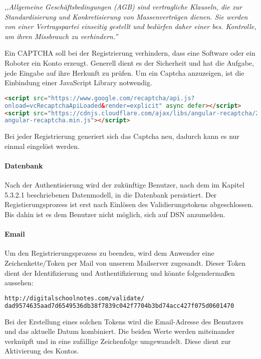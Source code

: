 \textit{,,Allgemeine Geschäftsbedingungen (AGB) sind vertragliche Klauseln, die zur Standardisierung und Konkretisierung von Massenverträgen dienen. Sie werden von einer Vertragspartei einseitig gestellt und bedürfen daher einer bes. Kontrolle, um ihren Missbrauch zu verhindern.''}\cite{AGB}\\
\cite{VERTEILTE_SYSTEME,PASSWORT_SCHUTZ}

\newpage


Ein \gls{CAPTCHA} soll bei der Registrierung verhindern, dass eine Software oder ein Roboter ein Konto erzeugt. Generell dient es der Sicherheit und hat die Aufgabe, jede Eingabe auf ihre Herkunft zu prüfen. Um ein Captcha anzuzeigen, ist die Einbindung einer JavaScript Library notwendig. \cite{CAPTCHA}
\begin{lstlisting}[caption={Einbindung der JS-Library Recaptcha}, language=HTML]
<script src="https://www.google.com/recaptcha/api.js?
onload=vcRecaptchaApiLoaded&render=explicit" async defer></script>
<script src="https://cdnjs.cloudflare.com/ajax/libs/angular-recaptcha/2.2.5/
angular-recaptcha.min.js"></script>
\end{lstlisting}

Bei jeder Registrierung generiert sich das Captcha neu, dadurch kann es nur einmal eingelöst werden.


\paragraph{Datenbank}
Nach der Authentisierung wird der zukünftige Benutzer, nach dem im Kapitel 5.3.2.1 beschriebenen Datenmodell, in die Datenbank persistiert. Der Registierungsprozess ist erst nach Einlösen des Validierungstokens abgeschlossen. Bis dahin ist es dem Benutzer nicht möglich, sich auf DSN anzumelden.

\paragraph{Email}
Um den Registrierungsprozess zu beenden, wird dem Anwender eine Zeichenkette/Token per Mail von unserem Mailserver zugesandt. Dieser Token dient der Identifizierung und Authentifizierung und könnte folgendermaßen aussehen:
\begin{lstlisting}[caption={Validierungstoken für die Aktivierung des DSN-Accounts}, language=bash]
http://digitalschoolnotes.com/validate/
dad9574635aad7d6549536db38f7839c042f7704b3bd74acc427f075d0601470
\end{lstlisting}
Bei der Erstellung eines solchen Tokens wird die Email-Adresse des Benutzers und das aktuelle Datum kombiniert. Die beiden Werte werden miteinander verknüpft und in eine zufällige Zeichenfolge umgewandelt. Diese dient zur Aktivierung des Kontos.

